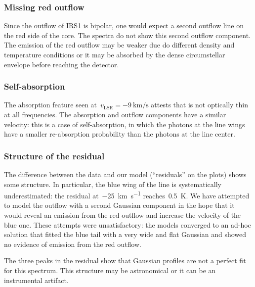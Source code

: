 \subsubsection{Missing red outflow}
Since the outflow of IRS1 is bipolar, one would expect a second outflow line on the red side of the core.
The spectra do not show this second outflow component.
The emission of the red outflow
may be weaker due do different density and temperature conditions
or it may be absorbed by the dense circumstellar envelope before reaching the detector.

\subsubsection{Self-absorption}
The absorption feature seen at~$v_\text{LSR}=\SI{-9}{\kilo\meter\per\second}$ attests that  is not optically thin at all frequencies.
The absorption and outflow components have a similar velocity:
this is a case of self-absorption, in which the photons at the line wings have a smaller re-absorption probability than the photons at the line center.

\subsubsection{Structure of the residual}
The difference between the data and our model (``residuals'' on the plots) shows some structure.
In particular, the blue wing of the line is systematically underestimated: the residual at~\SI{-25}{\kilo\meter\per\second} reaches~\SI{0.5}{\kelvin}.
We have attempted to model the outflow with a second Gaussian component in the hope that it would reveal an emission from the red outflow and increase the velocity of the blue one.
These attempts were unsatisfactory: the models converged to an ad-hoc solution that fitted the blue tail with a very wide and flat Gaussian and showed no evidence of emission from the red outflow.

The three peaks in the residual show that Gaussian profiles are not a perfect fit for this spectrum.
This structure may be astronomical or it can be an instrumental artifact.

